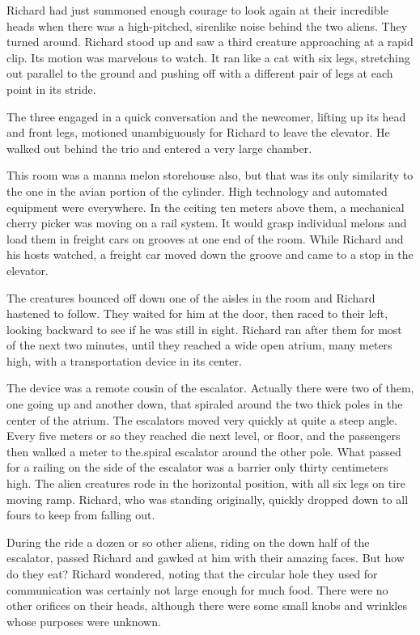 \documentclass[]{article}
\begin{document}
{Richard had just summoned enough courage to look again at their incredible heads when there was a high-pitched, sirenlike noise behind the two aliens. They turned around. Richard stood up and saw a third creature approaching at a rapid clip. Its motion was marvelous to watch. It ran like a cat with six legs, stretching out parallel to the ground and pushing off with a different pair of legs at each point in its stride.

The three engaged in a quick conversation and the newcomer, lifting up its head and front legs, motioned unambiguously for Richard to leave the elevator. He walked out behind the trio and entered a very large chamber.

This room was a manna melon storehouse also, but that was its only similarity to the one in the avian portion of the cylinder. High technology and automated equipment were everywhere. In the ceiting ten meters above them, a mechanical cherry picker was moving on a rail system. It would grasp individual melons and load them in freight cars on grooves at one end of the room. While Richard and his hosts watched, a freight car moved down the groove and came to a stop in the elevator.

The creatures bounced off down one of the aisles in the room and Richard hastened to follow. They waited for him at the door, then raced to their left, looking backward to see if he was still in sight. Richard ran after them for most of the next two minutes, until they reached a wide open atrium, many meters high, with a transportation device in its center.

The device was a remote cousin of the escalator. Actually there were two of them, one going up and another down, that spiraled around the two thick poles in the center of the atrium. The escalators moved very quickly at quite a steep angle. Every five meters or so they reached die next level, or floor, and the passengers then walked a meter to the.spiral escalator around the other pole. What passed for a railing on the side of the escalator was a barrier only thirty centimeters high. The alien creatures rode in the horizontal position, with all six legs on tire moving ramp. Richard, who was standing originally, quickly dropped down to all fours to keep from falling out.

During the ride a dozen or so other aliens, riding on the down half of the escalator, passed Richard and gawked at him with their amazing faces. But how do they eat? Richard wondered, noting that the circular hole they used for communication was certainly not large enough for much food. There were no other orifices on their heads, although there were some small knobs and wrinkles whose purposes were unknown.

}
\end{document}
